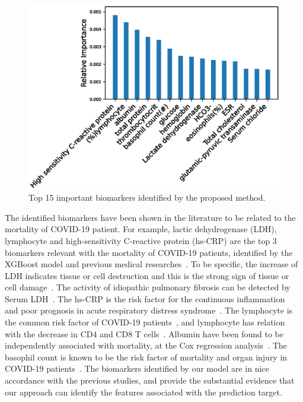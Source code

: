 \begin{figure}[h]
    \raggedright
    \includegraphics[width=1.0\linewidth]{figures/identified-features.eps}
    \caption{Top 15 important biomarkers identified by the proposed method.} \label{fig: identified-features}
\end{figure}
The identified biomarkers have been shown in the literature to be related to the mortality of COVID-19 patient. For example, lactic dehydrogenase (LDH), lymphocyte and high-sensitivity C-reactive protein (hs-CRP) are the top 3 biomarkers relevant with the mortality of COVID-19 patients, identified by the XGBoost model \cite{yan2020interpretable} and previous medical researches~\cite{kishaba2014staging,ridker2008rosuvastatin,wang2020clinical}. %
To be specific, the increase of LDH indicates tissue or cell destruction and this is the strong sign of tissue or cell damage~\cite{yan2020interpretable}. The activity of idiopathic pulmonary fibrosis can be detected by Serum LDH~\cite{kishaba2014staging}. The hs-CRP is the risk factor for the continuous inflammation~\cite{bajwa2009plasma} and poor prognosis in acute respiratory distress syndrome~\cite{kishaba2014staging,sharma2016aetiology}. The lymphocyte is the common risk factor of COVID-19 patients~\cite{chan2020familial}, and lymphocyte has relation with the decrease in CD4 and CD8 T cells~\cite{liu2020longitudinal}.
Albumin have been found to be independently associated with mortality, at the Cox regression analysis~\cite{violi2020albumin}. The basophil count is known to be the risk factor of mortality and organ injury in COVID-19 patients~\cite{li2020immune}. The biomarkers identified by our model are in nice accordance with the previous studies, and provide the substantial evidence that our approach can identify the features associated with the prediction target.

